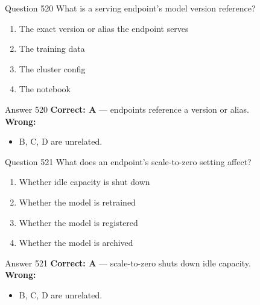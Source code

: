 \documentclass[aspectratio=169,11pt]{beamer}
\begin{document}
	\begin{frame}{Question 520}
		What is a serving endpoint's model version reference?
		\begin{enumerate}[label=\Alph*.]
			\item The exact version or alias the endpoint serves
			\item The training data
			\item The cluster config
			\item The notebook
		\end{enumerate}
	\end{frame}
	\begin{frame}{Answer 520}
		\textbf{Correct: A} --- endpoints reference a version or alias.\\
		\vspace{0.5em}
		\textbf{Wrong:}
		\begin{itemize}
			\item B, C, D are unrelated.
		\end{itemize}
	\end{frame}
	
	\begin{frame}{Question 521}
		What does an endpoint's scale-to-zero setting affect?
		\begin{enumerate}[label=\Alph*.]
			\item Whether idle capacity is shut down
			\item Whether the model is retrained
			\item Whether the model is registered
			\item Whether the model is archived
		\end{enumerate}
	\end{frame}
	\begin{frame}{Answer 521}
		\textbf{Correct: A} --- scale-to-zero shuts down idle capacity.\\
		\vspace{0.5em}
		\textbf{Wrong:}
		\begin{itemize}
			\item B, C, D are unrelated.
		\end{itemize}
	\end{frame}
	
\end{document}

